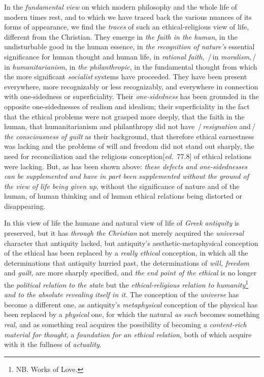 \documentclass[12pt,a4paper,openany]{book}
\newcommand{\kpage}[1]{\marginnote{\footnotesize\textit{[#1]}}}
\newcommand{\ed}[1]{{\small[\textit{ed.}\ #1]}}
\newcommand{\ins}[1]{\,/\,#1\,/\,}
\begin{document}
In the \emph{fundamental view} on which modern philosophy and
the whole life of modern times rest, and to which we have traced back the various
nuances of its forms of appearance, we find the \emph{traces}
\kpage{186}of such an ethical-religious view of life, different from the Christian.
They emerge in \emph{the faith in the human}, in the undisturbable
good in the human essence, in \emph{the recognition of nature's} essential
significance for human thought and human life, in
\emph{rational faith}, \ins{in \emph{moralism},} in \emph{humanitarianism}, in \emph{the philanthropic}, in the
fundamental thought from which the more significant \emph{socialist} systems have proceeded.
They have been present everywhere, more recognizably or less recognizably,
and everywhere in connection with one-sidedness or superficiality.
Their \emph{one-sidedness} has been grounded in the opposite one-sidednesses of realism and
idealism; their superficiality in the fact that the ethical problems
were not grasped more deeply, that the faith in the human, that
humanitarianism and philanthropy did not have \ins{\emph{resignation} and}
\emph{the consciousness of guilt} as their background, that therefore ethical earnestness was lacking
and the problems of will and freedom did not stand out sharply, the need for reconciliation
and the religious conception\ed{77.8} of ethical relations
were lacking. But, as has been shown above: \emph{these defects and one-sidednesses
can be supplemented and have in part been supplemented without the ground of the view of life
being given up}, without the significance of nature and of the human, of human
thinking and of human ethical relations being distorted
or disappearing.

In this view of life the humane and natural view of life of \emph{Greek antiquity}
is preserved, but it has \emph{through the Christian} not merely
acquired the \emph{universal} character that antiquity lacked, but antiquity's
aesthetic-metaphysical conception of the ethical has been replaced by a
\emph{really ethical} conception, in which all the determinations that antiquity
hurried past, the determinations of \emph{will, freedom} and \emph{guilt}, are more sharply
specified, and \emph{the end point of the ethical} is no longer the \emph{political
relation to the state} but the \emph{ethical-religious relation to humanity}\footnote[149]{NB. Works of Love.}
\emph{and to the absolute
revealing itself in it}. The conception of the \emph{universe} has become a different one,
as antiquity's \emph{metaphysical} conception of the physical has been replaced
by a \emph{physical} one, for which the natural \emph{as such} becomes something \emph{real}, and
as something real acquires the possibility of becoming \emph{a content-rich material for thought},
a \emph{foundation for an ethical relation}, both of which acquire with it the fullness of \emph{actuality}.
\end{document}
